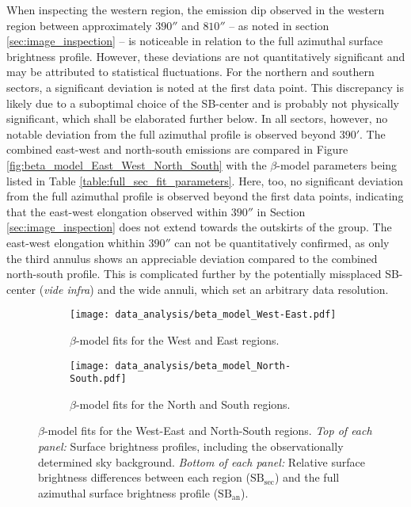 When inspecting the western region, the emission dip observed in the western region between approximately \(390''\) and \(810''\) -- as noted in section \ref{sec:image_inspection} -- is noticeable in relation to the full azimuthal surface brightness profile. However, these deviations are not quantitatively significant and may be attributed to statistical fluctuations. For the northern and southern sectors, a significant deviation is noted at the first data point. This discrepancy is likely due to a suboptimal choice of the SB-center and is probably not physically significant, which shall be elaborated further below. In all sectors, however, no notable deviation from the full azimuthal profile is observed beyond \(390'\). The combined east-west and north-south emissions are compared in Figure \ref{fig:beta_model_East_West_North_South} with the \(\beta\)-model parameters being listed in Table \ref{table:full_sec_fit_parameters}. Here, too, no significant deviation from the full azimuthal profile is observed beyond the first data points, indicating that the east-west elongation observed within \(390''\) in Section \ref{sec:image_inspection} does not extend towards the outskirts of the group. The east-west elongation whithin \(390''\) can not be quantitatively confirmed, as only the third annulus shows an appreciable deviation compared to the combined north-south profile. This is complicated further by the potentially missplaced SB-center (\textit{vide infra}) and the wide annuli, which set an arbitrary data resolution. 
\begin{figure}[htbp]
    \centering
    \begin{subfigure}{\textwidth}
        \centering
        \texttt{[image: data\_analysis/beta\_model\_West-East.pdf]}
        \caption{\(\beta\)-model fits for the West and East regions.}
        \label{fig:beta_model_West_East}
    \end{subfigure}
    \vspace{0.5cm} 
    \begin{subfigure}{\textwidth}
        \centering
        \texttt{[image: data\_analysis/beta\_model\_North-South.pdf]}
        \caption{\(\beta\)-model fits for the North and South regions.}
        \label{fig:beta_model_North_South}
    \end{subfigure}
    \caption{\(\beta\)-model fits for the West-East and North-South regions. \textit{Top of each panel:} Surface brightness profiles, including the observationally determined sky background. \textit{Bottom of each panel:} Relative surface brightness differences between each region (\(\text{SB}_{\text{sec}}\)) and the full azimuthal surface brightness profile (\(\text{SB}_{\text{an}}\)).}
    \label{fig:beta_models_West_North}
\end{figure}
